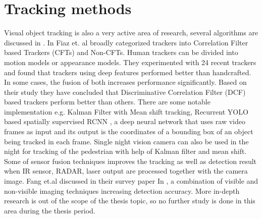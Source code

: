 \section{Tracking methods}
Visual object tracking is also a very active area of research, several algorithms are discussed in \cite{fiaz2019handcrafted,xu2005pedestrian,ning2017spatially}.
In \cite{fiaz2019handcrafted} Fiaz et. al broadly categorized trackers into Correlation Filter based Trackers (CFTs) and Non-CFTs. Human trackers can be divided into motion models or appearance models. They experimented with 24 recent trackers and found that trackers using deep features performed better than handcrafted. In some cases, the fusion of both increases performance significantly. Based on their study they have concluded that Discriminative Correlation Filter (DCF) based trackers perform better than others. There are some notable implementation e.g. 
Kalman Filter with Mean shift tracking, Recurrent YOLO based spatially supervised RCNN \cite{ning2017spatially}, a deep neural network that uses raw video frames as input and its output is the coordinates of a bounding box of an object being tracked in each frame. Single night vision camera can also be used in the night for tracking of the pedestrian with help of Kalman filter and mean shift. Some of sensor fusion techniques improves the tracking as well as detection result when IR sensor, RADAR, laser output are processed together with the camera image. Fang et.al discussed in their survey paper In \cite{gonzalez2016pedestrian}, a combination of visible and non-visible imaging techniques increasing detection accuracy. More in-depth research is out of the scope of the thesis topic, so no further study is done in this area during the thesis period.




